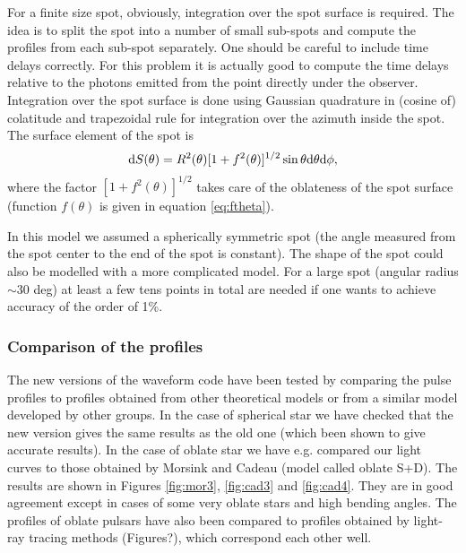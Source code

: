 \documentclass{wihuri}
\def\be{\begin{equation}}
\def\ee{\end{equation}}
\def\d{{\rm d}}
\begin{document}
For a finite size spot, obviously, integration over the spot surface is required. 
The idea is to split the spot into a number of small sub-spots and compute the profiles from each sub-spot separately. One should be careful to include time delays correctly. For this problem it is actually good to compute the time delays relative to the photons emitted from the point directly under the observer. Integration over the spot surface is done using Gaussian quadrature in (cosine of) colatitude and trapezoidal rule for integration over the azimuth inside the spot. The surface element of the spot is 
\be \label{eq:surf_element}
\d S(\theta) = R^{2}(\theta) [1+f^{2}(\theta)]^{1/2} \sin \theta \d \theta \d \phi ,
\ee
where the factor $[1+f^{2}(\theta)]^{1/2}$ takes care of the oblateness of the spot surface (function $f(\theta)$ is given in equation \ref{eq:ftheta}).

In this model we assumed a spherically symmetric spot (the angle measured from the spot center to the end of the spot is constant). The shape of the spot could also be modelled with a more complicated model. For a large spot (angular radius $\sim$30 deg) at least a few tens points in total are needed if one wants to achieve accuracy of the order of 1\%.



\subsubsection{Comparison of the profiles}

The new versions of the waveform code have been tested by comparing the pulse profiles to profiles obtained from other theoretical models or from a similar model developed by other groups. In the case of spherical star we have checked that the new version gives the same results as the old one (which been shown to give accurate results). In the case of oblate star we have e.g. compared our light curves to those obtained by Morsink \cite{morsink} and Cadeau \cite{cadeau} (model called oblate S+D). The results are shown in Figures \ref{fig:mor3}, \ref{fig:cad3} and \ref{fig:cad4}. They are in good agreement except in cases of some very oblate stars and high bending angles. The profiles of oblate pulsars have also been compared to profiles obtained by light-ray tracing methods (Figures?), which correspond each other well. 
\end{document}
